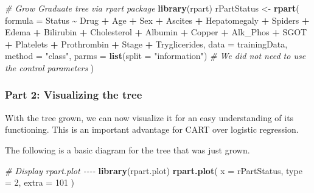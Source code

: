 \documentclass[
]{article}
\newenvironment{Shaded}{\begin{snugshade}}{\end{snugshade}}
\newcommand{\AttributeTok}[1]{\textcolor[rgb]{0.13,0.29,0.53}{#1}}
\newcommand{\CommentTok}[1]{\textcolor[rgb]{0.56,0.35,0.01}{\textit{#1}}}
\newcommand{\DecValTok}[1]{\textcolor[rgb]{0.00,0.00,0.81}{#1}}
\newcommand{\FunctionTok}[1]{\textcolor[rgb]{0.13,0.29,0.53}{\textbf{#1}}}
\newcommand{\NormalTok}[1]{#1}
\newcommand{\OtherTok}[1]{\textcolor[rgb]{0.56,0.35,0.01}{#1}}
\newcommand{\SpecialCharTok}[1]{\textcolor[rgb]{0.81,0.36,0.00}{\textbf{#1}}}
\newcommand{\StringTok}[1]{\textcolor[rgb]{0.31,0.60,0.02}{#1}}
\begin{document}
\begin{Shaded}
\begin{Highlighting}[]
\CommentTok{\# Grow Graduate tree via rpart package}
\FunctionTok{library}\NormalTok{(rpart)}
\NormalTok{rPartStatus }\OtherTok{\textless{}{-}} \FunctionTok{rpart}\NormalTok{(}
  \AttributeTok{formula =}\NormalTok{ Status }\SpecialCharTok{\textasciitilde{}}\NormalTok{ Drug }\SpecialCharTok{+}\NormalTok{ Age }\SpecialCharTok{+}\NormalTok{ Sex }\SpecialCharTok{+}\NormalTok{ Ascites }\SpecialCharTok{+}\NormalTok{ Hepatomegaly }\SpecialCharTok{+}\NormalTok{ Spiders }\SpecialCharTok{+}\NormalTok{ Edema }\SpecialCharTok{+}\NormalTok{ Bilirubin }\SpecialCharTok{+}\NormalTok{ Cholesterol }\SpecialCharTok{+}\NormalTok{ Albumin }\SpecialCharTok{+}\NormalTok{ Copper }\SpecialCharTok{+}\NormalTok{ Alk\_Phos }\SpecialCharTok{+}\NormalTok{ SGOT }\SpecialCharTok{+}\NormalTok{ Platelets }\SpecialCharTok{+}\NormalTok{ Prothrombin }\SpecialCharTok{+}\NormalTok{ Stage }\SpecialCharTok{+}\NormalTok{ Tryglicerides, }
  \AttributeTok{data =}\NormalTok{ trainingData,}
  \AttributeTok{method =} \StringTok{"class"}\NormalTok{,}
  \AttributeTok{parms =} \FunctionTok{list}\NormalTok{(}\AttributeTok{split =} \StringTok{"information"}\NormalTok{)}
  \CommentTok{\# We did not need to use the control parameters}
\NormalTok{)}
\end{Highlighting}
\end{Shaded}

\hypertarget{part-2-visualizing-the-tree}{%
\subsubsection{Part 2: Visualizing the
tree}\label{part-2-visualizing-the-tree}}

With the tree grown, we can now visualize it for an easy understanding
of its functioning. This is an important advantage for CART over
logistic regression.

The following is a basic diagram for the tree that was just grown.

\begin{Shaded}
\begin{Highlighting}[]
\CommentTok{\# Display rpart.plot {-}{-}{-}{-}}
 \FunctionTok{library}\NormalTok{(rpart.plot)}
\FunctionTok{rpart.plot}\NormalTok{(}
  \AttributeTok{x =}\NormalTok{ rPartStatus,}
  \AttributeTok{type =} \DecValTok{2}\NormalTok{,}
  \AttributeTok{extra =} \DecValTok{101}
\NormalTok{)}
\end{Highlighting}
\end{Shaded}
\end{document}
